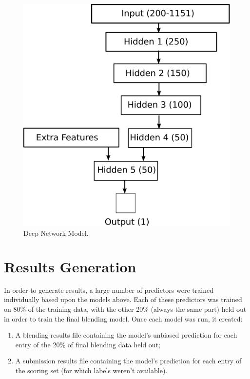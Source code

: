 \documentclass{article}
\begin{document}
\begin{figure}[ht]
\vskip 0.2in
\begin{center}
\centerline{\includegraphics{deepnet}}
\caption{Deep Network Model.}
\label{figure:deepnet}
\end{center}
\vskip -0.2in
\end{figure} 

\section{Results Generation}

In order to generate results, a large number of predictors were trained individually based upon the models above.  Each of these predictors was trained on 80\% of the training data, with the other 20\% (always the same part) held out in order to train the final blending model.  Once each model was run, it created:

\begin{enumerate}
\item A blending results file containing the model's unbiased prediction for each entry of the 20\% of final blending data held out;
\item A submission results file containing the model's prediction for each entry of the scoring set (for which labels weren't available).
\end{enumerate}
\end{document}
